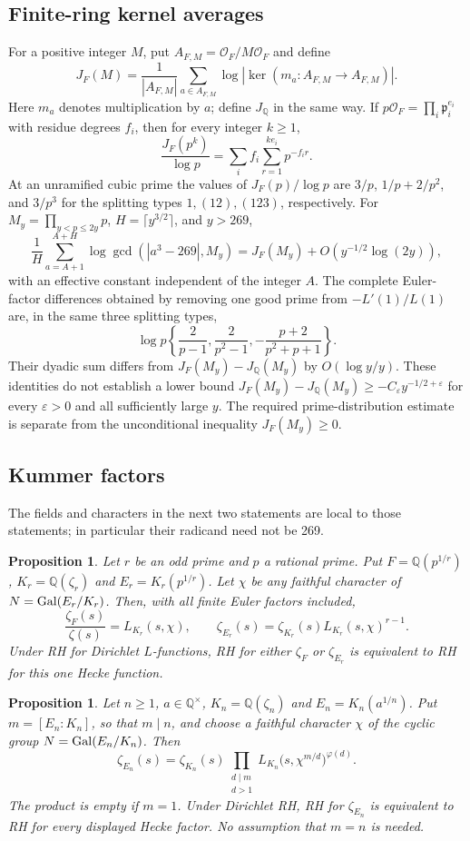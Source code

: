\documentclass[11pt]{article}
\newtheorem{proposition}[theorem]{Proposition}
\theoremstyle{remark}\newtheorem{remark}[theorem]{Remark}
\newcommand{\Q}{\mathbb Q}\newcommand{\Z}{\mathbb Z}\newcommand{\C}{\mathbb C}
\begin{document}
\subsection*{Finite-ring kernel averages}
For a positive integer $M$, put $A_{F,M}=\mathcal O_F/M\mathcal O_F$
and define
\[
 J_F(M)=\frac1{|A_{F,M}|}\sum_{a\in A_{F,M}}
        \log|\ker(m_a:A_{F,M}\longrightarrow A_{F,M})|.
\]
Here $m_a$ denotes multiplication by $a$; define $J_\Q$ in the
same way. If $p\mathcal O_F=\prod_i\mathfrak p_i^{e_i}$ with
residue degrees $f_i$, then for every integer $k\ge1$,
\[
 \frac{J_F(p^k)}{\log p}=\sum_i f_i\sum_{r=1}^{ke_i}p^{-f_i r}.
\]
At an unramified cubic prime the values of $J_F(p)/\log p$ are
$3/p$, $1/p+2/p^2$, and $3/p^3$ for the splitting types
$1,(12),(123)$, respectively. For
$M_y=\prod_{y<p\le2y}p$, $H=\lceil y^{3/2}\rceil$, and $y>269$,
\[
 \frac1H\sum_{a=A+1}^{A+H}\log\gcd(|a^3-269|,M_y)
   =J_F(M_y)+O(y^{-1/2}\log(2y)),
\]
with an effective constant independent of the integer $A$.
The complete Euler-factor differences obtained by removing one good
prime from $-L'(1)/L(1)$ are, in the same three splitting types,
\[
 \log p\left\{\frac2{p-1},\frac2{p^2-1},
                     -\frac{p+2}{p^2+p+1}\right\}.
\]
Their dyadic sum differs from $J_F(M_y)-J_\Q(M_y)$ by
$O(\log y/y)$. These identities do not establish a lower bound
$J_F(M_y)-J_\Q(M_y)\ge-C_\varepsilon y^{-1/2+\varepsilon}$
for every $\varepsilon>0$ and all sufficiently large $y$.
The required prime-distribution estimate is separate from the
unconditional inequality $J_F(M_y)\ge0$.

\subsection*{Kummer factors}
The fields and characters in the next two statements are local to
those statements; in particular their radicand need not be 269.
\begin{proposition}\label{prop:prime-kummer}
Let $r$ be an odd prime and $p$ a rational prime. Put $F=\Q(p^{1/r})$, $K_r=\Q(\zeta_r)$ and $E_r=K_r(p^{1/r})$. Let $\chi$ be any faithful character of $N=\operatorname{Gal}(E_r/K_r)$. Then, with all finite Euler factors included,
\[
 \frac{\zeta_F(s)}{\zeta(s)}=L_{K_r}(s,\chi),\qquad
 \zeta_{E_r}(s)=\zeta_{K_r}(s)L_{K_r}(s,\chi)^{r-1}.
\]
Under RH for Dirichlet $L$-functions, RH for either $\zeta_F$ or $\zeta_{E_r}$ is equivalent to RH for this one Hecke function.
\end{proposition}

\begin{proposition}\label{prop:composite-kummer}
Let $n\ge1$, $a\in\Q^\times$, $K_n=\Q(\zeta_n)$ and $E_n=K_n(a^{1/n})$. Put $m=[E_n:K_n]$, so that $m\mid n$, and choose a faithful character $\chi$ of the cyclic group $N=\operatorname{Gal}(E_n/K_n)$. Then
\[
 \zeta_{E_n}(s)=\zeta_{K_n}(s)
 \prod_{\substack{d\mid m\\d>1}}
 L_{K_n}\bigl(s,\chi^{m/d}\bigr)^{\varphi(d)}.
\]
The product is empty if $m=1$. Under Dirichlet RH, RH for $\zeta_{E_n}$ is equivalent to RH for every displayed Hecke factor. No assumption that $m=n$ is needed.
\end{proposition}
\end{document}
